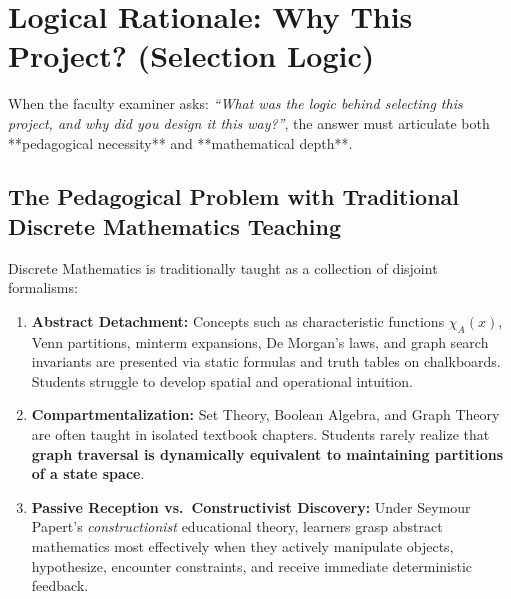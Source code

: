 \documentclass[11pt,a4paper]{article}
\theoremstyle{definition}
\begin{document}
\hrulefill

\section{Logical Rationale: Why This Project? (Selection Logic)}

When the faculty examiner asks: \textit{``What was the logic behind selecting this project, and why did you design it this way?''}, the answer must articulate both **pedagogical necessity** and **mathematical depth**.

\subsection{The Pedagogical Problem with Traditional Discrete Mathematics Teaching}
Discrete Mathematics is traditionally taught as a collection of disjoint formalisms:
\begin{enumerate}
  \item \textbf{Abstract Detachment:} Concepts such as characteristic functions $\chi_A(x)$, Venn partitions, minterm expansions, De Morgan's laws, and graph search invariants are presented via static formulas and truth tables on chalkboards. Students struggle to develop spatial and operational intuition.
  \item \textbf{Compartmentalization:} Set Theory, Boolean Algebra, and Graph Theory are often taught in isolated textbook chapters. Students rarely realize that \textbf{graph traversal is dynamically equivalent to maintaining partitions of a state space}.
  \item \textbf{Passive Reception vs.\ Constructivist Discovery:} Under Seymour Papert's \textit{constructionist} educational theory, learners grasp abstract mathematics most effectively when they actively manipulate objects, hypothesize, encounter constraints, and receive immediate deterministic feedback.
\end{enumerate}
\end{document}

